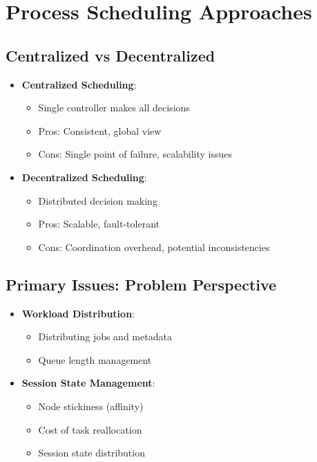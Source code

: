 \documentclass[12pt]{article}
\begin{document}
\section{Process Scheduling Approaches}

\subsection{Centralized vs Decentralized}
\begin{itemize}
\item \textbf{Centralized Scheduling}:
  \begin{itemize}
  \item Single controller makes all decisions
  \item Pros: Consistent, global view
  \item Cons: Single point of failure, scalability issues
  \end{itemize}
  
\item \textbf{Decentralized Scheduling}:
  \begin{itemize}
  \item Distributed decision making
  \item Pros: Scalable, fault-tolerant
  \item Cons: Coordination overhead, potential inconsistencies
  \end{itemize}
\end{itemize}

\subsection{Primary Issues: Problem Perspective}
\begin{itemize}
\item \textbf{Workload Distribution}:
  \begin{itemize}
  \item Distributing jobs and metadata
  \item Queue length management
  \end{itemize}
  
\item \textbf{Session State Management}:
  \begin{itemize}
  \item Node stickiness (affinity)
  \item Cost of task reallocation
  \item Session state distribution
  \end{itemize}
\end{itemize}
\end{document}
